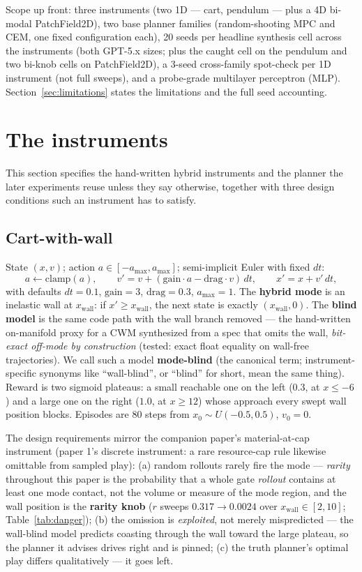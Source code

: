 \documentclass[11pt]{article}
\theoremstyle{definition}
\theoremstyle{remark}
\begin{document}
Scope up front: three instruments (two 1D --- cart, pendulum --- plus a 4D bi-modal PatchField2D), two base planner families (random-shooting MPC and CEM, one fixed configuration each), 20 seeds per headline synthesis cell across the instruments (both GPT-5.x sizes; plus the caught cell on the pendulum and two bi-knob cells on PatchField2D), a 3-seed cross-family spot-check per 1D instrument (not full sweeps), and a probe-grade multilayer perceptron (MLP). Section~\ref{sec:limitations} states the limitations and the full seed accounting.

\section{The instruments}
\label{sec:instrument}

This section specifies the hand-written hybrid instruments and the planner the later experiments reuse unless they say otherwise, together with three design conditions such an instrument has to satisfy.

\subsection{Cart-with-wall}
\label{sec:cartwall}

State $(x, v)$; action $a \in [-a_{\max}, a_{\max}]$; semi-implicit Euler with fixed $dt$:
\[
a \leftarrow \mathrm{clamp}(a), \qquad
v' = v + (\mathrm{gain}\cdot a - \mathrm{drag}\cdot v)\,dt, \qquad
x' = x + v'\,dt,
\]
with defaults $dt = 0.1$, $\mathrm{gain} = 3$, $\mathrm{drag} = 0.3$, $a_{\max} = 1$. The \textbf{hybrid mode} is an inelastic wall at $x_\mathrm{wall}$: if $x' \geq x_\mathrm{wall}$, the next state is exactly $(x_\mathrm{wall}, 0)$. The \textbf{blind model} is the same code path with the wall branch removed --- the hand-written on-manifold proxy for a CWM synthesized from a spec that omits the wall, \emph{bit-exact off-mode by construction} (tested: exact float equality on wall-free trajectories). We call such a model \textbf{mode-blind} (the canonical term; instrument-specific synonyms like ``wall-blind'', or ``blind'' for short, mean the same thing). Reward is two sigmoid plateaus: a small reachable one on the left ($0.3$, at $x \leq -6$) and a large one on the right ($1.0$, at $x \geq 12$) whose approach every swept wall position blocks. Episodes are 80 steps from $x_0 \sim U(-0.5, 0.5)$, $v_0 = 0$.

The design requirements mirror the companion paper's material-at-cap instrument (paper 1's discrete instrument: a rare resource-cap rule likewise omittable from sampled play): (a) random rollouts rarely fire the mode --- \emph{rarity} throughout this paper is the probability that a whole gate \emph{rollout} contains at least one mode contact, not the volume or measure of the mode region, and the wall position is the \textbf{rarity knob} ($r$ sweeps $0.317 \to 0.0024$ over $x_\mathrm{wall} \in [2, 10]$; Table~\ref{tab:danger}); (b) the omission is \emph{exploited}, not merely mispredicted --- the wall-blind model predicts coasting through the wall toward the large plateau, so the planner it advises drives right and is pinned; (c) the truth planner's optimal play differs qualitatively --- it goes left.
\end{document}
